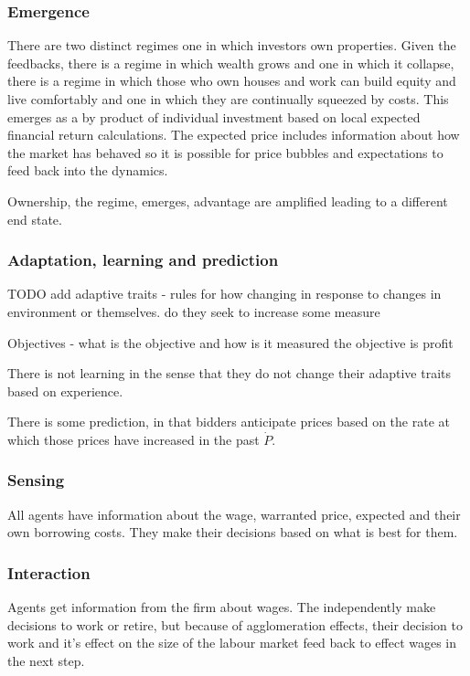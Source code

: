 {{\subsubsection{Emergence}
There are two distinct regimes one in which investors own properties. Given the feedbacks, there is a regime in which wealth grows and one in which it collapse, there is a regime in which those who own houses and work can build equity and live comfortably and one in which they are continually squeezed by costs. This emerges as a by product of individual investment based on local expected financial return calculations. 
The expected price includes information about how the market has behaved so it is possible for price bubbles and expectations to feed back into the dynamics. 

Ownership, the regime, emerges, advantage are amplified leading to a different end state.

\subsubsection{Adaptation, learning and prediction}

TODO add adaptive traits - rules for how changing in response to changes in environment or themselves. do they seek to increase some measure

Objectives - what is the objective and how is it measured
the objective is profit

There is not learning in the sense that they do not change their adaptive traits based on experience. 


There is some prediction, in that bidders anticipate prices based on the rate at which those prices have increased in the past $\dot P$.


\subsubsection{Sensing}
All agents have information about the wage, warranted price, expected and their own borrowing costs. They make their decisions based on what is best for them. 

\subsubsection{Interaction}
Agents get information from the firm about wages. The independently make decisions to work or retire, but because of agglomeration effects, their decision to work and it's effect on the size of the labour market feed back to effect wages in the next step. 

}}
